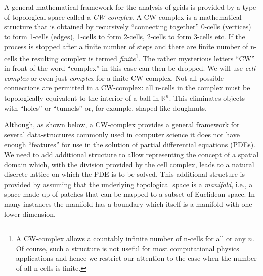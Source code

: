 \documentclass[11pt, reqno]{amsart}
\theoremstyle{definition}
\begin{document}

A general mathematical framework for the analysis of grids is provided
by a type of topological space called a \emph{CW-complex}. A
CW-complex is a mathematical structure that is obtained by recursively
``connecting together'' 0-cells (vertices) to form 1-cells (edges),
1-cells to form 2-cells, 2-cells to form 3-cells etc. If the process
is stopped after a finite number of steps and there are finite number
of n-cells the resulting complex is termed \emph{finite}\footnote{A
  CW-complex allows a countably infinite number of n-cells for all or
  any $n$. Of course, such a structure is not useful for most
  computational physics applications and hence we restrict our
  attention to the case when the number of all n-cells is
  finite.}. The rather mysterious letters ``CW'' in front of the word
``complex'' in this case can then be dropped. We will use \emph{cell
  complex} or even just \emph{complex} for a finite CW-complex. Not
all possible connections are permitted in a CW-complex: all n-cells in
the complex must be topologically equivalent to the interior of a ball
in $\mathbb{R}^n$. This eliminates objects with ``holes'' or
``tunnels'' or, for example, shaped like doughnuts.

Although, as shown below, a CW-complex provides a general framework
for several data-structures commonly used in computer science it does
not have enough ``features'' for use in the solution of partial
differential equations (PDEs). We need to add additional structure to
allow representing the concept of a spatial domain which, with the
division provided by the cell complex, leads to a natural discrete
lattice on which the PDE is to be solved. This additional structure is
provided by assuming that the underlying topological space is a
\emph{manifold}, i.e., a space made up of patches that can be mapped
to a subset of Euclidean space. In many instances the manifold has a
boundary which itself is a manifold with one lower dimension.



\end{document}
